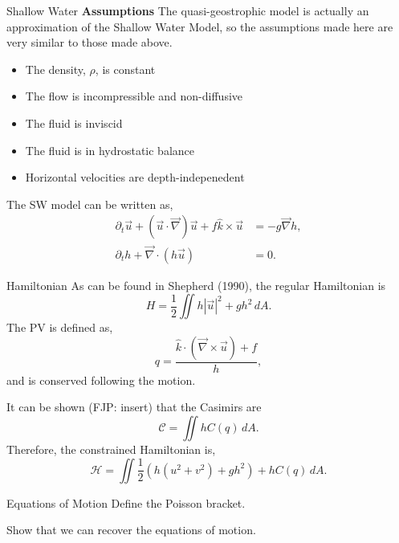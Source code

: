 \documentclass[12pt]{article}
\begin{document}
\newpage
\begin{section}{Shallow Water}
    \textbf{Assumptions}
    The quasi-geostrophic model is actually an approximation of the Shallow Water Model, so the assumptions made here are very similar to those made above.
    \begin{itemize}
        \item The density, $\rho$, is constant
        \item The flow is incompressible and non-diffusive
        \item The fluid is inviscid
        \item The fluid is in hydrostatic balance
        \item Horizontal velocities are depth-indepenedent
    \end{itemize}

    The SW model can be written as,
    \begin{align*}
        \partial_t \vec u + (\vec u \cdot \vec \nabla) \vec u + f \hat k \times \vec u &= - g \vec \nabla h, \\
        \partial_t h + \vec\nabla \cdot \left( h \vec u \right) & = 0.
    \end{align*}

    \begin{subsection}{Hamiltonian}
        As can be found in Shepherd (1990), the regular Hamiltonian is
        $$
        H = \frac12 \iint h | \vec u |^2 + g h^2 \, dA.
        $$
        The PV is defined as,
        $$
        q = \frac{ \hat k \cdot (\vec \nabla \times \vec u) + f}{h},
        $$
        and is conserved following the motion.

        It can be shown (FJP: insert) that the Casimirs are
        $$
        \mathcal{C} = \iint hC(q) \, dA.
        $$
        Therefore, the constrained Hamiltonian is,
        $$
        \mathcal{H} =  \iint \frac12  \left( h (u^2 + v^2) + g h^2 \right) + h C(q) \, dA.
        $$
    \end{subsection}

    \begin{subsection}{Equations of Motion}
        Define the Poisson bracket.

        Show that we can recover the equations of motion.
    \end{subsection}


\end{section}
\end{document}
